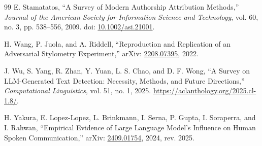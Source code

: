 \documentclass[11pt]{article}
\theoremstyle{plain}
\theoremstyle{definition}
\theoremstyle{remark}
\begin{document}
\begin{thebibliography}{99}
E. Stamatatos,
``A Survey of Modern Authorship Attribution Methods,''
\emph{Journal of the American Society for Information Science and Technology}, vol. 60, no. 3, pp. 538--556, 2009.
doi: \href{https://doi.org/10.1002/asi.21001}{10.1002/asi.21001}.

H. Wang, P. Juola, and A. Riddell,
``Reproduction and Replication of an Adversarial Stylometry Experiment,''
arXiv: \href{https://arxiv.org/abs/2208.07395}{2208.07395}, 2022.

J. Wu, S. Yang, R. Zhan, Y. Yuan, L. S. Chao, and D. F. Wong,
``A Survey on LLM-Generated Text Detection: Necessity, Methods, and Future Directions,''
\emph{Computational Linguistics}, vol. 51, no. 1, 2025.
\url{https://aclanthology.org/2025.cl-1.8/}.

H. Yakura, E. Lopez-Lopez, L. Brinkmann, I. Serna, P. Gupta, I. Soraperra, and I. Rahwan,
``Empirical Evidence of Large Language Model's Influence on Human Spoken Communication,''
arXiv: \href{https://arxiv.org/abs/2409.01754}{2409.01754}, 2024, rev. 2025.

\end{thebibliography}
\end{document}
